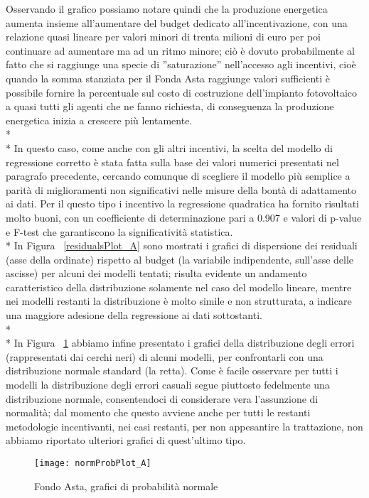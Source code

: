 \documentclass[12pt,a4paper,openright,twoside]{report}
\begin{document}
Osservando il grafico possiamo notare quindi che la produzione energetica aumenta insieme all'aumentare del budget dedicato all'incentivazione, con una relazione quasi lineare per valori minori di trenta milioni di euro per poi continuare ad aumentare ma ad un ritmo minore; ciò è dovuto probabilmente al fatto che si raggiunge una specie di ''saturazione'' nell'accesso agli incentivi, cioè quando la somma stanziata per il Fonda Asta raggiunge valori sufficienti è possibile fornire la percentuale sul costo di costruzione dell'impianto fotovoltaico a quasi tutti gli agenti che ne fanno richiesta, di conseguenza la produzione energetica inizia a crescere più lentamente.\\* \\*
In questo caso, come anche con gli altri incentivi, la scelta del modello di regressione corretto è stata fatta sulla base dei valori numerici presentati nel paragrafo precedente, cercando comunque di scegliere il modello più semplice a parità di miglioramenti non significativi nelle misure della bontà di adattamento ai dati. Per il questo tipo i incentivo la regressione quadratica ha fornito risultati molto buoni, con un coefficiente di determinazione pari a 0.907 e valori di p-value e F-test che garantiscono la significatività statistica.\\*
In Figura ~\ref{residualsPlot_A} sono mostrati i grafici di dispersione dei residuali (asse della ordinate) rispetto al budget (la variabile indipendente, sull'asse delle ascisse) per alcuni dei modelli tentati; risulta evidente un andamento caratteristico della distribuzione solamente nel caso del modello lineare, mentre nei modelli restanti la distribuzione è molto simile e non strutturata, a indicare una maggiore adesione della regressione ai dati sottostanti.\\* \\*
In Figura ~\ref{normProbPlot_A} abbiamo infine presentato i grafici della distribuzione degli errori (rappresentati dai cerchi neri) di alcuni modelli, per confrontarli con una distribuzione normale standard (la retta). Come è facile osservare per tutti i modelli la distribuzione degli errori casuali segue piuttosto fedelmente una distribuzione normale, consentendoci di considerare vera l'assunzione di normalità; dal momento che questo avviene anche per tutti le restanti metodologie incentivanti, nei casi restanti, per non appesantire la trattazione, non abbiamo riportato ulteriori grafici di quest'ultimo tipo. 

\begin{figure}[H]
	\centering
	\texttt{[image: normProbPlot\_A]}
	\caption{Fondo Asta, grafici di probabilità normale}
	\label{normProbPlot_A}
\end{figure}
\end{document}
